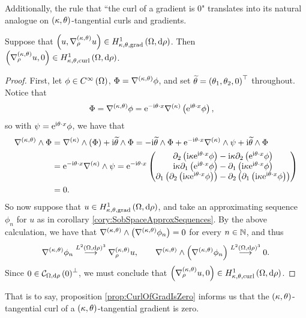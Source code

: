 Additionally, the rule that ``the curl of a gradient is 0" translates into its natural analogue on $\kt$-tangential curls and gradients.
\begin{prop} \label{prop:CurlOfGradIsZero}
	Suppose that $\bracs{u,\ktgrad_{\rho}u}\in\ktgradSob{\ddom}{\rho}$.
	Then $\bracs{\ktgrad_{\rho}u, 0}\in\ktcurlSob{\ddom}{\rho}$.
\end{prop}
\begin{proof}
	First, let $\phi\in\smooth{\ddom}$, $\Phi = \ktgrad\phi$, and set $\widetilde{\qm} = \bracs{\qm_1, \qm_2, 0}^\top$ throughout.
	Notice that
	\begin{align*}
		\Phi = \ktgrad\phi &= \e^{-\rmi\qm\cdot x}\kgrad\bracs{ \e^{\rmi\qm\cdot x}\phi },
	\end{align*}
	so with $\psi = \e^{\rmi\qm\cdot x}\phi$, we have that
	\begin{align*}
		\ktcurl{}\Phi 
		&= \kgrad\wedge\bracs{ \Phi } + \rmi\widetilde{\qm}\wedge\Phi
		= -\rmi\widetilde{\qm}\wedge\Phi + \e^{-\rmi\qm\cdot x}\kgrad\wedge\psi + \rmi\widetilde{\qm}\wedge\Phi \\
		&= \e^{-\rmi\qm\cdot x}\kgrad\wedge\psi
		= \e^{-\rmi\qm\cdot x} 
		\begin{pmatrix}
			\partial_2\bracs{ \rmi\wavenumber \e^{\rmi\qm\cdot x}\phi } - \rmi\wavenumber\partial_2\bracs{ \e^{\rmi\qm\cdot x}\phi } \\
			\rmi\wavenumber\partial_1\bracs{ \e^{\rmi\qm\cdot x}\phi } - \partial_1\bracs{ \rmi\wavenumber \e^{\rmi\qm\cdot x}\phi } \\
			\partial_1\bracs{ \partial_2\bracs{\rmi\wavenumber\e^{\rmi\qm\cdot x}\phi} } - \partial_2\bracs{ \partial_1\bracs{\rmi\wavenumber\e^{\rmi\qm\cdot x}\phi} }
		\end{pmatrix} \\
		&= 0.
	\end{align*}
	So now suppose that $u\in\ktgradSob{\ddom}{\rho}$, and take an approximating sequence $\phi_n$ for $u$ as in corollary \ref{cory:SobSpaceApproxSequences}.
	By the above calculation, we have that $\ktcurl{}\bracs{\ktgrad\phi_n}=0$ for every $n\in\naturals$, and thus
	\begin{align*}
		\ktgrad\phi_n \lconv{\ltwo{\ddom}{\rho}^3} \ktgrad_{\rho}u, \qquad
		\ktcurl{}\bracs{\ktgrad\phi_n} \lconv{\ltwo{\ddom}{\rho}^3} 0.
	\end{align*}
	Since $0\in\curlZero{\ddom}{\rho}^\perp$, we must conclude that $\bracs{ \ktgrad_{\rho}u, 0 }\in\ktcurlSob{\ddom}{\rho}$.
\end{proof}
That is to say, proposition \ref{prop:CurlOfGradIsZero} informs us that the $\kt$-tangential curl of a $\kt$-tangential gradient is zero.

